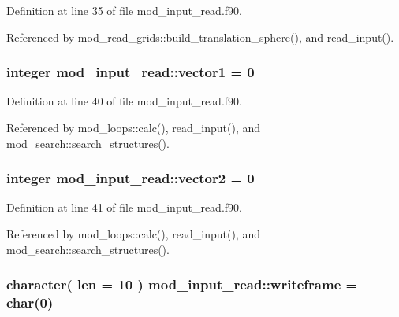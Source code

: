 Definition at line 35 of file mod\+\_\+input\+\_\+read.\+f90.



Referenced by mod\+\_\+read\+\_\+grids\+::build\+\_\+translation\+\_\+sphere(), and read\+\_\+input().

\subsubsection[{\texorpdfstring{vector1}{vector1}}]{\setlength{\rightskip}{0pt plus 5cm}integer mod\+\_\+input\+\_\+read\+::vector1 = 0}\hypertarget{namespacemod__input__read_a9b7f8f60997dd0fb2edfa04aef14fa29}{}\label{namespacemod__input__read_a9b7f8f60997dd0fb2edfa04aef14fa29}


Definition at line 40 of file mod\+\_\+input\+\_\+read.\+f90.



Referenced by mod\+\_\+loops\+::calc(), read\+\_\+input(), and mod\+\_\+search\+::search\+\_\+structures().

\subsubsection[{\texorpdfstring{vector2}{vector2}}]{\setlength{\rightskip}{0pt plus 5cm}integer mod\+\_\+input\+\_\+read\+::vector2 = 0}\hypertarget{namespacemod__input__read_afe62d1fbe309ed810c66abd20164a320}{}\label{namespacemod__input__read_afe62d1fbe309ed810c66abd20164a320}


Definition at line 41 of file mod\+\_\+input\+\_\+read.\+f90.



Referenced by mod\+\_\+loops\+::calc(), read\+\_\+input(), and mod\+\_\+search\+::search\+\_\+structures().

\subsubsection[{\texorpdfstring{writeframe}{writeframe}}]{\setlength{\rightskip}{0pt plus 5cm}character( len = 10 ) mod\+\_\+input\+\_\+read\+::writeframe = char(0)}\hypertarget{namespacemod__input__read_a7327a05a4121e6b530adab45fdaa5d19}{}\label{namespacemod__input__read_a7327a05a4121e6b530adab45fdaa5d19}


